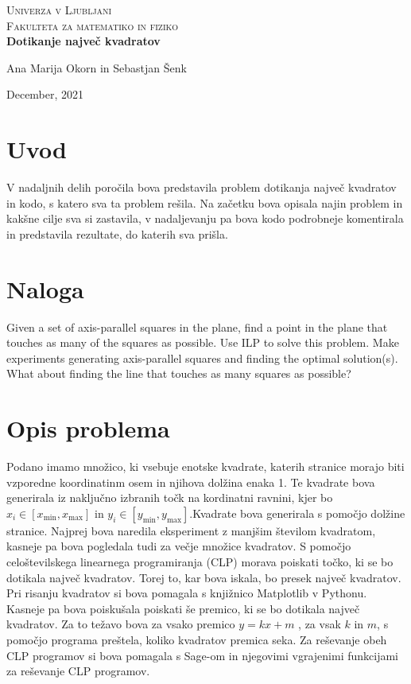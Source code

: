 \documentclass[a4paper]{article}
\begin{document}
\begin{titlepage}
\center
\textsc{\LARGE Univerza v Ljubljani}\\[0.6cm]
\textsc{\Large Fakulteta za matematiko in fiziko}\\[0.6cm]

{\huge\bfseries Dotikanje največ kvadratov}\\[0.4cm]


\vfill\vfill\vfill

{ Ana Marija Okorn in Sebastjan Šenk}

{ December, 2021}

\vfill

\end{titlepage}

\tableofcontents

\newpage

\section{Uvod}

V  nadaljnih delih poročila bova predstavila problem dotikanja največ kvadratov in kodo, s katero sva ta problem rešila. Na začetku bova opisala najin problem in kakšne cilje sva si zastavila, v nadaljevanju pa bova kodo podrobneje komentirala in predstavila rezultate, do katerih sva prišla.

\section{Naloga}

Given a set of axis-parallel squares in the plane, find a point in the plane that touches as many of the squares as possible. Use ILP to solve this problem. Make experiments generating axis-parallel squares and finding the optimal solution(s). What about finding the line that touches as many squares as possible?

\section{Opis problema}

Podano imamo množico, ki vsebuje enotske kvadrate, katerih stranice morajo biti vzporedne koordinatinm osem in njihova dolžina enaka 1. Te kvadrate bova generirala iz naključno izbranih točk na kordinatni ravnini, kjer bo $x_i \in [x_{\min}, x_{\max}]$  in $y_i \in [y_{\min}, y_{\max}].$Kvadrate bova generirala s pomočjo dolžine stranice. Najprej bova naredila eksperiment z manjšim številom kvadratom, kasneje pa bova pogledala tudi za večje množice kvadratov. S pomočjo celoštevilskega linearnega programiranja (CLP) morava poiskati točko, ki se bo dotikala največ kvadratov. Torej to, kar bova iskala, bo presek največ kvadratov. Pri risanju kvadratov si bova pomagala s knjižnico Matplotlib v Pythonu.  Kasneje pa bova poiskušala poiskati še premico, ki se bo dotikala največ kvadratov. Za to težavo bova za vsako premico $y = kx + m$ , za vsak $k$ in $m$, s pomočjo programa preštela, koliko kvadratov premica seka. Za reševanje obeh CLP programov si bova pomagala s Sage-om in njegovimi vgrajenimi funkcijami za reševanje CLP programov.
\end{document}
